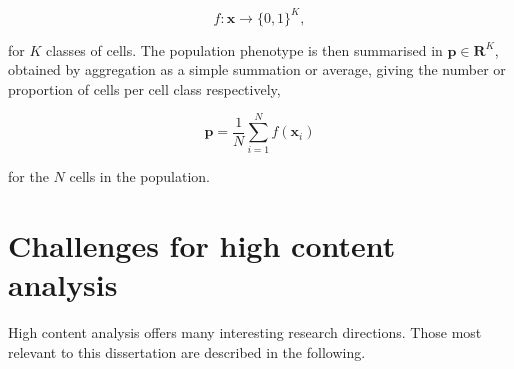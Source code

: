 \begin{equation}
f : \mathbf{x} \to \{0, 1\}^K,
\end{equation}

for $K$ classes of cells. The population phenotype is then summarised in $\mathbf{p} \in \mathbf{R}^K$, obtained by aggregation as a simple summation or average, giving the number or proportion of cells per cell class respectively,

\begin{equation}
\mathbf{p} = \frac{1}{N}\sum_{i=1}^N f(\mathbf{x}_i)
\end{equation}

for the $N$ cells in the population. 
%

\section{Challenges for high content analysis}

High content analysis offers many interesting research directions. Those most relevant to this dissertation are described in the following.

